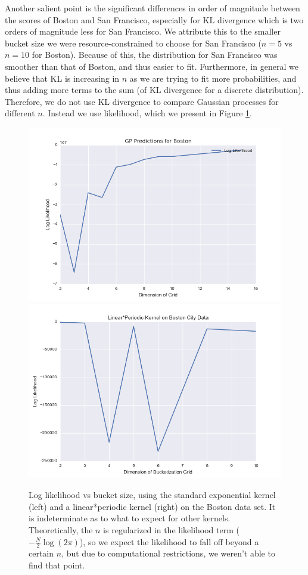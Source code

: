 \documentclass[letterpaper, 11 pt, conference]{ieeeconf}  %
\begin{document}
Another salient point is the significant differences in order of magnitude between the scores of Boston and San Francisco, especially for KL divergence which is two orders of magnitude less for San Francisco. We attribute this to the smaller bucket size we were resource-constrained to choose for San Francisco ($n=5$ vs $n=10$ for Boston). Because of this, the distribution for San Francisco was smoother than that of Boston, and thus easier to fit. Furthermore, in general we believe that KL is increasing in $n$ as we are trying to fit more probabilities, and thus adding more terms to the sum (of KL divergence for a discrete distribution). Therefore, we do not use KL divergence to compare Gaussian processes for different $n$. Instead we use likelihood, which we present in Figure \ref{fig:log_likelihood}. 

\begin{figure}[h!]
\centering
\includegraphics[scale=0.2]{GPSE_log_likelihood}
\includegraphics[scale=0.2]{kl_likelihood_periodic_linear_periodic}
\caption{Log likelihood vs bucket size, using the standard exponential kernel (left) and a linear*periodic kernel (right) on the Boston data set. It is indeterminate as to what to expect for other kernels. Theoretically, the $n$ is regularized in the likelihood term ($-\frac{N}{2}\log(2\pi)$), so we expect the likelihood to fall off beyond a certain $n$, but due to computational restrictions, we weren't able to find that point.}
\label{fig:log_likelihood}
\end{figure}
\end{document}
